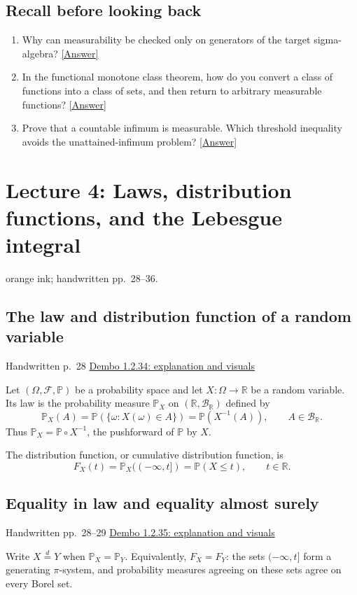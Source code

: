 \documentclass[11pt,letterpaper]{article}
\newcommand{\lecturesection}[1]{\subsection{#1}}
\begin{document}
\subsection*{Recall before looking back}
\begin{enumerate}
\item Why can measurability be checked only on generators of the target sigma-algebra? \hyperlink{answer-l3-s2}{[Answer]}
\item In the functional monotone class theorem, how do you convert a class of functions into a class of sets, and then return to arbitrary measurable functions? \hyperlink{answer-l3-s6}{[Answer]}
\item Prove that a countable infimum is measurable. Which threshold inequality avoids the unattained-infimum problem? \hyperlink{answer-l3-s8}{[Answer]}
\end{enumerate}

\clearpage
{}
\section{Lecture 4: Laws, distribution functions, and the Lebesgue integral}
{\small orange ink; handwritten pp.\ 28--36.}

\hypertarget{l4-s1}{}
\lecturesection{The law and distribution function of a random variable}
{\small\textcolor{lectureink}{Handwritten p.\ 28} \quad \href{https://josephrbailey.com/probability/\#entry-1-2-34}{Dembo 1.2.34: explanation and visuals}}

Let $(\Omega,\mathcal F,\mathbb P)$ be a probability space and let $X:\Omega\to\mathbb R$ be a random variable. Its law is the probability measure $\mathbb P_X$ on $(\mathbb R,\mathcal B_{\mathbb R})$ defined by \[\mathbb P_X(A)=\mathbb P(\{\omega:X(\omega)\in A\})=\mathbb P(X^{-1}(A)),\qquad A\in\mathcal B_{\mathbb R}.\] Thus $\mathbb P_X=\mathbb P\circ X^{-1}$, the pushforward of $\mathbb P$ by $X$.

The distribution function, or cumulative distribution function, is \[F_X(t)=\mathbb P_X(( -\infty,t])=\mathbb P(X\le t),\qquad t\in\mathbb R.\]

\hypertarget{l4-s2}{}
\lecturesection{Equality in law and equality almost surely}
{\small\textcolor{lectureink}{Handwritten pp.\ 28--29} \quad \href{https://josephrbailey.com/probability/\#entry-1-2-35}{Dembo 1.2.35: explanation and visuals}}

Write $X\overset{d}=Y$ when $\mathbb P_X=\mathbb P_Y$. Equivalently, $F_X=F_Y$: the sets $(-\infty,t]$ form a generating $\pi$-system, and probability measures agreeing on these sets agree on every Borel set.
\end{document}
